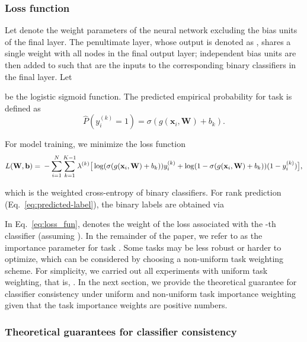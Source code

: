 \documentclass[times,twocolumn,final,authoryear]{elsarticle}
\begin{document}
\subsubsection{Loss function} 
\label{sec:loss}

Let  denote the weight parameters of the neural network excluding the bias units of the final layer. The penultimate layer, whose output is denoted as , shares a single weight with all nodes in the final output layer;  independent bias units are then added to  such that  are the inputs to the corresponding binary classifiers in the final layer. Let 

be the logistic sigmoid function. The predicted empirical probability for task  is defined as
\begin{dmath}
\widehat{P}(y_i^{(k)}=1)=\sigma(g(\mathbf{x}_i,\mathbf{W})+b_k).
\end{dmath}


For model training, we minimize the loss function
\begin{dmath}\label{eq:loss_fun}
    L(\mathbf{W},\mathbf{b})=\\
    - \sum_{i=1}^N\sum_{k=1}^{K-1} \lambda^{(k)}
    \big[ \log(\sigma(g(\mathbf{x}_i,\mathbf{W})+b_k))y_i^{(k)}  \\
    + \log(1-\sigma(g(\mathbf{x}_i,\mathbf{W})+b_k))(1-y_i^{(k)}) \big],
\end{dmath}



which is the weighted cross-entropy of  binary classifiers. For rank prediction (Eq.~\ref{eq:predicted-label}), the binary labels are obtained via



In Eq.~\ref{eq:loss_fun},  denotes the weight of the loss associated with the -th classifier (assuming ). In the remainder of the paper, we refer to  as the importance parameter for task . Some tasks may be less robust or harder to optimize, which can be considered by choosing a non-uniform task weighting scheme. For simplicity, we carried out all experiments with uniform task weighting, that is, . In the next section, we provide the theoretical guarantee for classifier consistency under uniform and non-uniform task importance weighting given that the task importance weights are positive numbers.



\subsubsection{Theoretical guarantees for classifier consistency} 
\label{sec:theoretical-guarantees}
\end{document}
